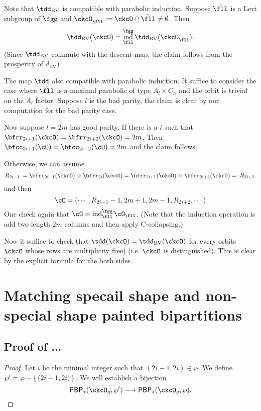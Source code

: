 \documentclass[12pt,a4paper]{amsart}
\DeclareMathOperator{\ind}{ind}
\numberwithin{equation}{section}
\theoremstyle{remark}
\def\dBV{d_{\mathrm{BV}}}
\def\PBP{\mathsf{PBP}}
\def\ckfgg{{\check \fgg}}
\def\tdBV{\tdd_{\text{BV}}}
\begin{document}
{Note that $\tdBV$ is compatible with parabolic induction.
Suppose $\ckfll$ is a Levi subgroup of $\ckfgg$ and
$\ckcO_{\ckfll}:=\ckcO\cap \ckfll\neq \emptyset$.
Then
\[
\tdBV(\ckcO) = \ind_{\fll}^{\fgg} \tdBV(\ckcO_{\ckfll}).
\]
(Since $\tdBV$ commute with the descent map, the claim follows from the
prosperity of $\dBV$)

The map $\tdd$ also compatible with parabolic induction.
It suffice to consider the case where $\ckfll$ is a maximal parabolic of type
$A_{l}\times C_{n}$ and
the orbit is trivial on the $A_{l}$ factor.
Suppose $l$ is the bad parity, the claim is clear by our computation for the bad
parity case.

Now suppose $l=2m$ has good parity. If there is a $i$ such that
$\bfrr_{2i+1}(\ckcO)=\bfrr_{2i+2}(\ckcO)=2m$. Then
$\bfcc_{2i+1}(\cO)=\bfcc_{2i+2}(\cO)=2m$ and the claim follows.

Otherwise, we can assume
\[
R_{2i-1}:=\bfrr_{2i-1}(\ckcO)> \bfrr_{2i}(\ckcO)=\bfrr_{2i+1}(\ckcO) > \bfrr_{2i+2}(\ckcO)=:R_{2i+2}.
\]
and then
\[
\cO = (\cdots, R_{2i-1}-1, 2m+1, 2m-1, R_{2i+2}, \cdots)
\]
One check again that $\cO = \ind_{\fll}^{\fgg}\cO_{\fll}$.
(Note that the induction operation is add two length $2m$ columns and then apply
C-collapsing.)

Now it suffice to check that
$\tdd(\ckcO) = \tdBV(\ckcO)$ for every orbits $\ckcO$ whose
rows are multiplicity free) (i.e. $\ckcO$ is distinguished).
This is clear by the explicit formula for the both sides.
}

\section{Matching specail shape and non-special shape painted bipartitions}
\label{app:comb}

\subsection{Proof of ...}
\begin{proof}
  Let $i$ be the minimal integer such that $(2i-1, 2i)\in \wp$.
  We define $\wp' = \wp - \set{(2i-1,2i)}$.
  We will establish a bijection
  \[
    \PBP_{\star}(\ckcO_{g}, \wp')\longrightarrow \PBP_{\star}(\ckcO_{g},\wp).
  \]
\end{proof}

\end{document}
